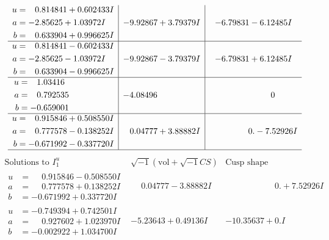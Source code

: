 \documentclass[1p]{elsarticle_modified}
\theoremstyle{definition}
\newcommand{\I}{\sqrt{-1}}
\begin{document}
$$\begin{array}{c|c|c}
\begin{aligned}
u &= \phantom{-}0.814841 + 0.602433 I \\
a &= -2.85625 + 1.03972 I \\
b &= \phantom{-}0.633904 + 0.996625 I\end{aligned}
 & -9.92867 + 3.79379 I & -6.79831 - 6.12485 I \\ \hline\begin{aligned}
u &= \phantom{-}0.814841 - 0.602433 I \\
a &= -2.85625 - 1.03972 I \\
b &= \phantom{-}0.633904 - 0.996625 I\end{aligned}
 & -9.92867 - 3.79379 I & -6.79831 + 6.12485 I \\ \hline\begin{aligned}
u &= \phantom{-}1.03416\phantom{ +0.000000I} \\
a &= \phantom{-}0.792535\phantom{ +0.000000I} \\
b &= -0.659001\phantom{ +0.000000I}\end{aligned}
 & -4.08496\phantom{ +0.000000I} & \phantom{-0.000000 } 0 \\ \hline\begin{aligned}
u &= \phantom{-}0.915846 + 0.508550 I \\
a &= \phantom{-}0.777578 - 0.138252 I \\
b &= -0.671992 - 0.337720 I\end{aligned}
 & \phantom{-}0.04777 + 3.88882 I & \phantom{-0.000000 } 0. - 7.52926 I\\
 \hline 
 \end{array}$$\newpage$$\begin{array}{c|c|c}  
\text{Solutions to }I^u_{1}& \I (\text{vol} + \sqrt{-1}CS) & \text{Cusp shape}\\
 \hline 
\begin{aligned}
u &= \phantom{-}0.915846 - 0.508550 I \\
a &= \phantom{-}0.777578 + 0.138252 I \\
b &= -0.671992 + 0.337720 I\end{aligned}
 & \phantom{-}0.04777 - 3.88882 I & \phantom{-0.000000 -}0. + 7.52926 I \\ \hline\begin{aligned}
u &= -0.749394 + 0.742501 I \\
a &= \phantom{-}0.927602 + 1.023970 I \\
b &= -0.002922 + 1.034700 I\end{aligned}
 & -5.23643 + 0.49136 I & -10.35637 + 0. I\phantom{ +0.000000I} \\ \hline\begin{aligned}

\end{aligned}
\end{array}$$
\end{document}
